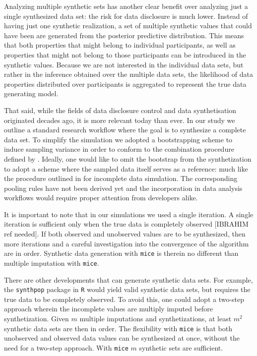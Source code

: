 \documentclass[psych,article,submit,moreauthors,pdftex]{mdpi}
\begin{document}
Analyzing multiple synthetic sets has another clear benefit over
analyzing just a single synthesized data set: the risk for data
disclosure is much lower. Instead of having just one synthetic
realization, a set of multiple synthetic values that could have been are
generated from the posterior predictive distribution. This means that
both properties that might belong to individual participants, as well as
properties that might not belong to those participants can be introduced
in the synthetic values. Because we are not interested in the individual
data sets, but rather in the inference obtained over the multiple data
sets, the likelihood of data properties distributed over participants is
aggregated to represent the true data generating model.

That said, while the fields of data disclosure control and data
synthetisation originated decades ago, it is more relevant today than
ever. In our study we outline a standard research workflow where the
goal is to synthesize a complete data set. To simplify the simulation we
adopted a bootstrapping scheme to induce sampling variance in order to
conform to the combination procedure defined by
\citet{reiter_partially_inference_2003}. Ideally, one would like to omit
the bootstrap from the synthetization to adopt a scheme where the
sampled data itself serves as a reference: much like the procedure
outlined in \citet{vink2014pooling} for incomplete data simulation. The
corresponding pooling rules have not been derived yet and the
incorporation in data analysis workflows would require proper attention
from developers alike.

It is important to note that in our simulations we used a single
iteration. A single iteration is sufficient only when the true data is
completely observed {[}IBRAHIM ref needed{]}. If both observed and
unobserved values are to be synthesized, then more iterations and a
careful investigation into the convergence of the algorithm are in
order. Synthetic data generation with \texttt{mice} is therein no
different than multiple imputation with \texttt{mice}.

There are other developments that can generate synthetic data sets. For
example, the \texttt{synthpop} \citet{synthpop} package in \texttt{R}
would yield valid synthetic data sets, but requires the true data to be
completely observed. To avoid this, one could adopt a two-step approach
wherein the incomplete values are multiply imputed before
synthetization. Given \(m\) multiple imputations and synthetizations, at
least \(m^2\) synthetic data sets are then in order. The flexibility
with \texttt{mice} is that both unobserved and observed data values can
be synthesized at once, without the need for a two-step approach. With
\texttt{mice} \(m\) synthetic sets are sufficient.
\end{document}
